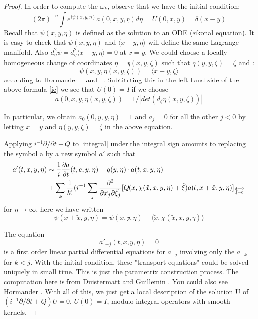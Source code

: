 \documentclass[10pt]{amsart}
\newcommand{\1}{\mathbb{1}}
\begin{document}
\begin{proof}
In order to compute the $\omega_k$, observe that we have the initial condition:
\begin{equation}\label{ic}
    (2\pi)^{-n} \int e^{i\psi(x,y,\eta)} a (0,x,y,\eta) d\eta = U(0,x,y) = \delta(x - y)
\end{equation}
Recall that $\psi(x,y,\eta)$ is defined as the solution to an ODE (eikonal equation). It is easy to check that $\psi(x,y,\eta)$ and $\langle x-y,\eta \rangle$ will define the same Lagrange manifold. Also $d^2_{\eta}\psi = d^2_{\eta} \langle x-y,\eta \rangle= 0$ at $x = y$. We could choose a locally homogeneous change of coordinates $\eta = \eta(x,y,\zeta)$ such that $\eta(y,y,\zeta) = \zeta$ and :
\begin{equation}
    \psi(x,y,\eta(x,y,\zeta)) = \langle x-y,\zeta \rangle
\end{equation}
according to Hormander ~\cite{FIO2} and ~\cite{FIO1}. Subtituting this in the left hand side of the above formula \eqref{ic} we see that $U(0) = I$ if we choose 
\begin{equation}
    a(0,x,y,\eta(x,y,\zeta)) = 1/|det (d_{\zeta} \eta(x,y,\zeta))|
\end{equation}

In particular, we obtain $a_0(0,y,y,\eta) =1 $ and $a_{j}= 0$  for all the other $j<0$ by letting $x = y$ and $\eta(y,y,\zeta)= \zeta$ in the above equation.

Applying $i^{-1} \partial/\partial t + Q$ to \eqref{integral} under the integral sign amounts to replacing the symbol a by a new symbol $a'$ such that
\begin{align*}
a'(t,x,y,\eta) &\sim \frac{1}{i}\frac{\partial a}{\partial t}(t,e,y,\eta) -q(y,\eta)\cdot a(t,x,y,\eta)\\
&+ \sum_{k} \frac{1}{k!} (i^{-1}\sum_{j}\frac{\partial^2}{\partial\tilde{x_j}\partial\tilde{\xi_j}}[Q(x,\chi(\tilde{x},x,y,\eta)+\tilde{\xi})a(t,x+\tilde{x},y,\eta)]_{\tilde{x}=0 \atop \tilde{\xi} =0}
\end{align*}
for $\eta \rightarrow \infty$, here we have written
\begin{equation}
    \psi(x+\tilde{x},y,\eta) = \psi (x,y,\eta) + \langle \tilde{x}, \chi(\tilde{x},x,y,\eta) \rangle
\end{equation}

The equation
\[
a'_{-j}(t,x,y,\eta) = 0
\]
is a first order linear partial differential equations for $a_{-j}$ involving only the $a_{-k}$ for $k < j$. With the initial condition, these "transport equations" could be solved uniquely in small time. This is just the parametrix construction process. The computation here is from Duistermatt and Guillemin \cite{DuistermaatGuillemin}. You could also see Hormander \cite{Hor68}. With all of this, we just get a local description of the solution U of $(i^{-1}\partial /\partial t +Q)U = 0$, $U(0) = I$, modulo integral operators with smooth kernels.


\end{proof}
\end{document}
